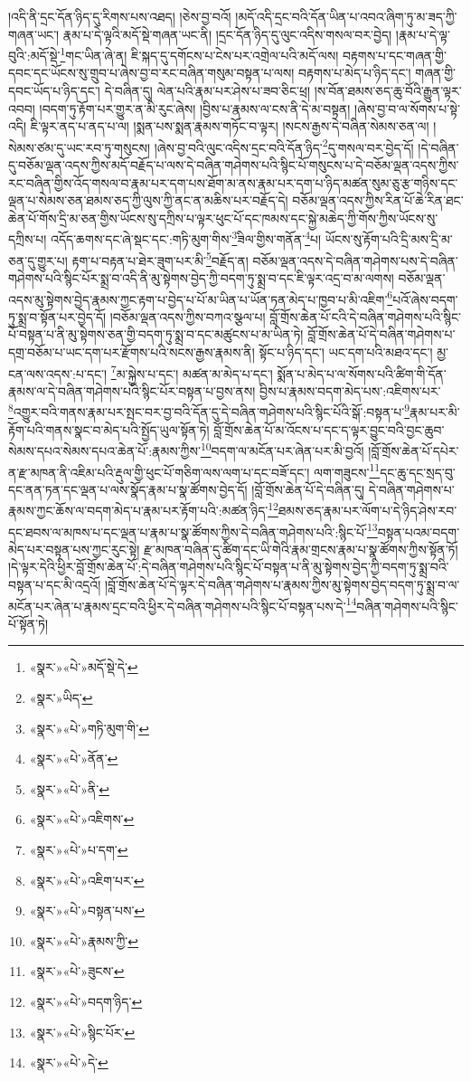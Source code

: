 །འདི་ནི་དྲང་དོན་ཉིད་དུ་རིགས་པས་འཐད། །ཅེས་བྱ་བའོ། །མདོ་འདི་དྲང་བའི་དོན་ཡིན་པ་འབའ་ཞིག་ཏུ་མ་ཟད་ཀྱི་གཞན་ཡང་། རྣམ་པ་དེ་ལྟའི་མདོ་སྡེ་གཞན་ཡང་ནི། །དྲང་དོན་ཉིད་དུ་ལུང་འདིས་གསལ་བར་བྱེད། །རྣམ་པ་དེ་ལྟ་བུའི་:མདོ་སྡེ་\footnote{«སྣར་»«པེ་»མདོ་སྡེ་དེ་}གང་ཡིན་ཞེ་ན། ཇི་སྐད་དུ་དགོངས་པ་ངེས་པར་འགྲེལ་པའི་མདོ་ལས། བརྟགས་པ་དང་གཞན་གྱི་དབང་དང་ཡོངས་སུ་གྲུབ་པ་ཞེས་བྱ་བ་རང་བཞིན་གསུམ་བསྟན་པ་ལས། བརྟགས་པ་མེད་པ་ཉིད་དང་། གཞན་གྱི་དབང་ཡོད་པ་ཉིད་དང་། དེ་བཞིན་དུ། ལེན་པའི་རྣམ་པར་ཤེས་པ་ཟབ་ཅིང་ཕྲ། །ས་བོན་ཐམས་ཅད་ཆུ་བོའི་རྒྱུན་ལྟར་འབབ། །བདག་ཏུ་རྟོག་པར་གྱུར་ན་མི་རུང་ཞེས། །བྱིས་པ་རྣམས་ལ་ངས་ནི་དེ་མ་བསྟན། །ཞེས་བྱ་བ་ལ་སོགས་པ་སྟེ་འདི། ཇི་ལྟར་ནད་པ་ནད་པ་ལ། །སྨན་པས་སྨན་རྣམས་གཏོང་བ་ལྟར། །སངས་རྒྱས་དེ་བཞིན་སེམས་ཅན་ལ། །སེམས་ཙམ་དུ་ཡང་རབ་ཏུ་གསུངས། །ཞེས་བྱ་བའི་ལུང་འདིས་དྲང་བའི་དོན་ཉིད་\footnote{«སྣར་»ཡིད་}དུ་གསལ་བར་བྱེད་དོ། །དེ་བཞིན་དུ་བཅོམ་ལྡན་འདས་ཀྱིས་མདོ་བརྗོད་པ་ལས་དེ་བཞིན་གཤེགས་པའི་སྙིང་པོ་གསུངས་པ་དེ་བཅོམ་ལྡན་འདས་ཀྱིས་རང་བཞིན་གྱིས་འོད་གསལ་བ་རྣམ་པར་དག་པས་ཐོག་མ་ནས་རྣམ་པར་དག་པ་ཉིད་མཚན་སུམ་ཅུ་རྩ་གཉིས་དང་ལྡན་པ་སེམས་ཅན་ཐམས་ཅད་ཀྱི་ལུས་ཀྱི་ནང་ན་མཆིས་པར་བརྗོད་དེ། བཅོམ་ལྡན་འདས་ཀྱིས་རིན་པོ་ཆེ་རིན་ཐང་ཆེན་པོ་གོས་དྲི་མ་ཅན་གྱིས་ཡོངས་སུ་དཀྲིས་པ་ལྟར་ཕུང་པོ་དང་ཁམས་དང་སྐྱེ་མཆེད་ཀྱི་གོས་ཀྱིས་ཡོངས་སུ་དཀྲིས་པ། འདོད་ཆགས་དང་ཞེ་སྡང་དང་:གཏི་མུག་གིས་\footnote{«སྣར་»«པེ་»གཏི་མུག་གི་}ཟིལ་གྱིས་གནོན་\footnote{«སྣར་»«པེ་»ནོན་}པ། ཡོངས་སུ་རྟོག་པའི་དྲི་མས་དྲི་མ་ཅན་དུ་གྱུར་པ། རྟག་པ་བརྟན་པ་ཐེར་ཟུག་པར་མི་\footnote{«སྣར་»«པེ་»ནི་}བརྗོད་ན། བཅོམ་ལྡན་འདས་དེ་བཞིན་གཤེགས་པས་དེ་བཞིན་གཤེགས་པའི་སྙིང་པོར་སྨྲ་བ་འདི་ནི་མུ་སྟེགས་བྱེད་ཀྱི་བདག་ཏུ་སྨྲ་བ་དང་ཇི་ལྟར་འདྲ་བ་མ་ལགས། བཅོམ་ལྡན་འདས་མུ་སྟེགས་བྱེད་རྣམས་ཀྱང་རྟག་པ་བྱེད་པ་པོ་མ་ཡིན་པ་ཡོན་ཏན་མེད་པ་ཁྱབ་པ་མི་འཇིག་\footnote{«སྣར་»«པེ་»འཇིགས་}པའོ་ཞེས་བདག་ཏུ་སྨྲ་བ་སྟོན་པར་བྱེད་དོ། །བཅོམ་ལྡན་འདས་ཀྱིས་བཀའ་སྩལ་པ། བློ་གྲོས་ཆེན་པོ་ངའི་དེ་བཞིན་གཤེགས་པའི་སྙིང་པོ་བསྟན་པ་ནི་མུ་སྟེགས་ཅན་གྱི་བདག་ཏུ་སྨྲ་བ་དང་མཚུངས་པ་མ་ཡིན་ཏེ། བློ་གྲོས་ཆེན་པོ་དེ་བཞིན་གཤེགས་པ་དགྲ་བཅོམ་པ་ཡང་དག་པར་རྫོགས་པའི་སངས་རྒྱས་རྣམས་ནི། སྟོང་པ་ཉིད་དང་། ཡང་དག་པའི་མཐའ་དང་། མྱ་ངན་ལས་འདས་:པ་དང་། \footnote{«སྣར་»«པེ་»པ་དག་}མ་སྐྱེས་པ་དང་། མཚན་མ་མེད་པ་དང་། སྨོན་པ་མེད་པ་ལ་སོགས་པའི་ཚིག་གི་དོན་རྣམས་ལ་དེ་བཞིན་གཤེགས་པའི་སྙིང་པོར་བསྟན་པ་བྱས་ནས། བྱིས་པ་རྣམས་བདག་མེད་པས་:འཇིགས་པར་\footnote{«སྣར་»«པེ་»འཇིག་པར་}འགྱུར་བའི་གནས་རྣམ་པར་སྤང་བར་བྱ་བའི་དོན་དུ་དེ་བཞིན་གཤེགས་པའི་སྙིང་པོའི་སྒོ་:བསྟན་པ་\footnote{«སྣར་»«པེ་»བསྟན་པས་}རྣམ་པར་མི་རྟོག་པའི་གནས་སྣང་བ་མེད་པའི་སྤྱོད་ཡུལ་སྟོན་ཏེ། བློ་གྲོས་ཆེན་པོ་མ་འོངས་པ་དང་ད་ལྟར་བྱུང་བའི་བྱང་ཆུབ་སེམས་དཔའ་སེམས་དཔའ་ཆེན་པོ་:རྣམས་ཀྱིས་\footnote{«སྣར་»«པེ་»རྣམས་ཀྱི་}བདག་ལ་མངོན་པར་ཞེན་པར་མི་བྱའོ། །བློ་གྲོས་ཆེན་པོ་དཔེར་ན་རྫ་མཁན་ནི་འཇིམ་པའི་རྡུལ་གྱི་ཕུང་པོ་གཅིག་ལས་ལག་པ་དང་བཟོ་དང་། ལག་གཟུངས་\footnote{«སྣར་»«པེ་»ཟུངས་}དང་ཆུ་དང་སྲད་བུ་དང་ནན་ཏན་དང་ལྡན་པ་ལས་སྣོད་རྣམ་པ་སྣ་ཚོགས་བྱེད་དོ། །བློ་གྲོས་ཆེན་པོ་དེ་བཞིན་དུ། དེ་བཞིན་གཤེགས་པ་རྣམས་ཀྱང་ཆོས་ལ་བདག་མེད་པ་རྣམ་པར་རྟོག་པའི་:མཚན་ཉིད་\footnote{«སྣར་»«པེ་»བདག་ཉིད་}ཐམས་ཅད་རྣམ་པར་ལོག་པ་དེ་ཉིད་ཤེས་རབ་དང་ཐབས་ལ་མཁས་པ་དང་ལྡན་པ་རྣམ་པ་སྣ་ཚོགས་ཀྱིས་དེ་བཞིན་གཤེགས་པའི་:སྙིང་པོ་\footnote{«སྣར་»«པེ་»སྙིང་པོར་}བསྟན་པའམ་བདག་མེད་པར་བསྟན་པས་ཀྱང་རུང་སྟེ། རྫ་མཁན་བཞིན་དུ་ཚིག་དང་ཡི་གེའི་རྣམ་གྲངས་རྣམ་པ་སྣ་ཚོགས་ཀྱིས་སྟོན་ཏོ། །དེ་ལྟར་དེའི་ཕྱིར་བློ་གྲོས་ཆེན་པོ་:དེ་བཞིན་གཤེགས་པའི་སྙིང་པོ་བསྟན་པ་ནི་མུ་སྟེགས་བྱེད་ཀྱི་བདག་ཏུ་སྨྲ་བའི་བསྟན་པ་དང་མི་འདྲའོ། །བློ་གྲོས་ཆེན་པོ་དེ་ལྟར་དེ་བཞིན་གཤེགས་པ་རྣམས་ཀྱིས་མུ་སྟེགས་བྱེད་བདག་ཏུ་སྨྲ་བ་ལ་མངོན་པར་ཞེན་པ་རྣམས་དྲང་བའི་ཕྱིར་དེ་བཞིན་གཤེགས་པའི་སྙིང་པོ་བསྟན་པས་དེ་\footnote{«སྣར་»«པེ་»དེ་}བཞིན་གཤེགས་པའི་སྙིང་པོ་སྟོན་ཏེ། 